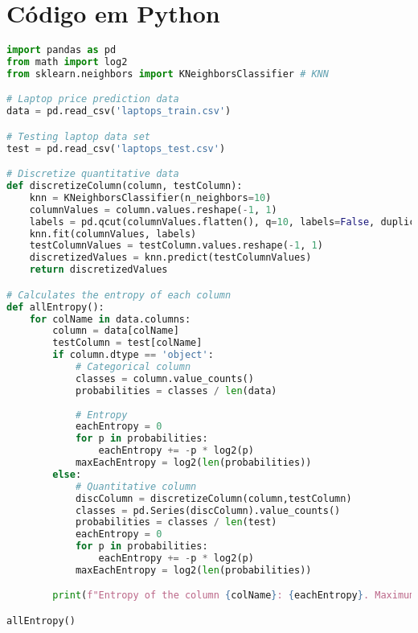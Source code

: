 \documentclass{report}
\begin{document}
\newpage
\section{Código em Python}

\begin{lstlisting}[language=Python, caption=Código em Python da Entropia]
import pandas as pd
from math import log2
from sklearn.neighbors import KNeighborsClassifier # KNN

# Laptop price prediction data
data = pd.read_csv('laptops_train.csv')

# Testing laptop data set
test = pd.read_csv('laptops_test.csv')

# Discretize quantitative data
def discretizeColumn(column, testColumn):
    knn = KNeighborsClassifier(n_neighbors=10)
    columnValues = column.values.reshape(-1, 1)
    labels = pd.qcut(columnValues.flatten(), q=10, labels=False, duplicates='drop')
    knn.fit(columnValues, labels)
    testColumnValues = testColumn.values.reshape(-1, 1)
    discretizedValues = knn.predict(testColumnValues)
    return discretizedValues

# Calculates the entropy of each column
def allEntropy():
    for colName in data.columns:
        column = data[colName]
        testColumn = test[colName]
        if column.dtype == 'object':
            # Categorical column
            classes = column.value_counts()
            probabilities = classes / len(data)
            
            # Entropy
            eachEntropy = 0
            for p in probabilities:
                eachEntropy += -p * log2(p)
            maxEachEntropy = log2(len(probabilities))
        else:
            # Quantitative column
            discColumn = discretizeColumn(column,testColumn)
            classes = pd.Series(discColumn).value_counts()
            probabilities = classes / len(test)
            eachEntropy = 0
            for p in probabilities:
                eachEntropy += -p * log2(p)
            maxEachEntropy = log2(len(probabilities))

        print(f"Entropy of the column {colName}: {eachEntropy}. Maximum: {maxEachEntropy}")

allEntropy()
\end{lstlisting}
\end{document}
